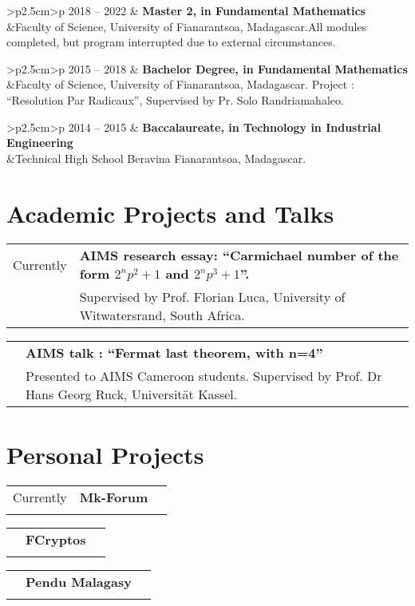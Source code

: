 \documentclass[11pt,oneside]{article}
\newcommand{\link}[1]{\href{#1}{\color{cyan}\faGlobe}}
\newcommand{\cvEduc}[3]{\begin{tabular}{>{\raggedleft\arraybackslash}p{2.5cm}>{\arraybackslash}p{\linewidth}}
		#1 & \textbf{#2}  \\
		&#3 \\
\end{tabular}}
\newcommand{\cvWP}[4]{\begin{tabular}{>{\raggedleft\arraybackslash}p{2.5cm}>{\raggedright\arraybackslash}p{8cm}>{\raggedleft\arraybackslash}p{\linewidth-2.5cm}}%
		#1 & \textbf{#2} & \textbf{#3}\\%
		&\multicolumn{2}{>{\arraybackslash}p{\linewidth - 3.2cm}}{#4}\\%
\end{tabular}}
\newcommand{\cvWPA}[3]{\begin{tabular}{>{\raggedleft\arraybackslash}p{2.5cm}>{\raggedright\arraybackslash}p{13cm}}%
		#1 & \textbf{#2}\\%
		&#3\\%
\end{tabular}}
\begin{document}
\vspace*{5pt}
\cvEduc{2018 -- 2022}{Master 2, in Fundamental Mathematics}{Faculty of Science, University of Fianarantsoa, Madagascar.\newline All modules completed, but program interrupted due to external circumstances.}
%

\vspace*{5pt}
\cvEduc{2015 -- 2018}{Bachelor Degree, in Fundamental Mathematics}{Faculty of Science, University of Fianarantsoa, Madagascar.\newline
Project : ``Resolution Par Radicaux'', Supervised by Pr. Solo Randriamahaleo.}
% 

\vspace*{5pt}
\cvEduc{2014 -- 2015}{Baccalaureate, in Technology in Industrial Engineering}{Technical High School Beravina Fianarantsoa, Madagascar.}

\section{Academic Projects and Talks}
\cvWPA{Currently}{AIMS research essay: ``Carmichael number of the form $2^np^2+1$ and $2^np^3+1$''.}{Supervised by Prof. Florian Luca, University of Witwatersrand, South Africa.}
%

\vspace*{5pt}
\cvWPA{2023}{AIMS talk : ``Fermat last theorem, with n=4'' \link{https://drive.google.com/file/d/1NQMheu7RrMmY6wJM9X-6aasbnj1nnsfF/view?usp=share_link}}{Presented to AIMS Cameroon students. Supervised by Prof. Dr Hans Georg Ruck, Universität Kassel.}
%
\section{Personal Projects}
%
\cvWP{Currently}{Mk-Forum \link{https://github.com/Fahazavana/MK-Forum}}{}{Creation of a forum dedicated to Mathematics with HTML, CSS/Bootstrap, JS for the Front-end and Python3/Django, MySQL for the Back-End.}
%

\vspace*{5pt}
\cvWP{2023}{FCryptos \link{https://github.com/Fahazavana/FCryptos} }{}{Implementation of cryptography methods with Python : Shift cipher, Vin\`egre cipher, SPN, RSA, ENIGMA machine.}
%

\vspace*{5pt}
\cvWP{2022}{Pendu Malagasy \link{https://github.com/Fahazavana/Pendu\_Malagasy}}{}{A Malagasy version of the game hangman, built with Python3/TKinter.}
\end{document}
